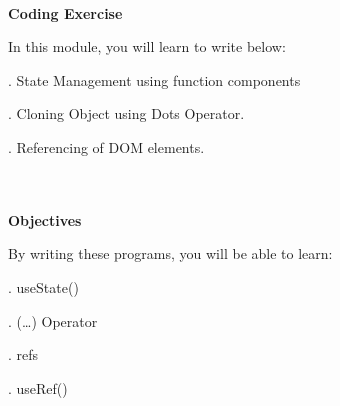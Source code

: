 \documentclass{article}
\begin{document}

\noindent 

\noindent \\
\textbf{Coding Exercise}

\noindent 
In this module, you will learn to write below:

. State Management using function components 

. Cloning Object using Dots Operator.

. Referencing of DOM elements.

\noindent \\\\

\noindent \textbf{Objectives}

\noindent 
By writing these programs, you will be able to learn:

. useState() 

. (…) Operator

. refs

. useRef()
\end{document}
